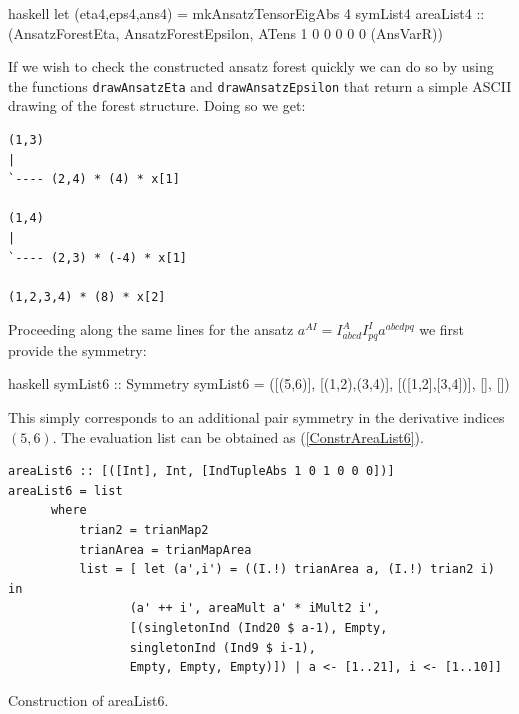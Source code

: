 \documentclass[a4paper,12pt, DIV=14, BCOR=5mm, twoside, headsepline, numbers=noenddot]{scrbook}
\begin{document}
\begin{center}
\begin{cminted}{haskell}
let (eta4,eps4,ans4) = mkAnsatzTensorEigAbs 4 symList4 areaList4 :: 
                         (AnsatzForestEta, AnsatzForestEpsilon,
                         ATens 1 0 0 0 0 0 (AnsVarR))
\end{cminted}
\end{center}

If we wish to check the constructed ansatz forest quickly we can do so by using the functions \texttt{drawAnsatzEta} and \texttt{drawAnsatzEpsilon} that return a simple ASCII drawing of the forest structure. Doing so we get:

\begin{center}
\begin{BVerbatim}
(1,3)
|
`---- (2,4) * (4) * x[1]

(1,4)
|
`---- (2,3) * (-4) * x[1]

(1,2,3,4) * (8) * x[2]
\end{BVerbatim}
\end{center}

Proceeding along the same lines for the ansatz $a^{AI} = I^A _{abcd} I^I_{pq} a^{abcdpq}$ we first provide the symmetry:

\begin{center}
\begin{cminted}{haskell}
symList6 :: Symmetry
symList6 = ([(5,6)], [(1,2),(3,4)], [([1,2],[3,4])], [], [])
\end{cminted}
\end{center}

This simply corresponds to an additional pair symmetry in the derivative indices $(5,6)$. The evaluation list can be obtained as (\ref{ConstrAreaList6}).

\begin{listing}[hbt!]
\begin{verbatim}
areaList6 :: [([Int], Int, [IndTupleAbs 1 0 1 0 0 0])]
areaList6 = list
      where
          trian2 = trianMap2
          trianArea = trianMapArea
          list = [ let (a',i') = ((I.!) trianArea a, (I.!) trian2 i) in
                 (a' ++ i', areaMult a' * iMult2 i', 
                 [(singletonInd (Ind20 $ a-1), Empty,
                 singletonInd (Ind9 $ i-1),
                 Empty, Empty, Empty)]) | a <- [1..21], i <- [1..10]]
\end{verbatim} 
\caption{Construction of areaList6.}\label{ConstrAreaList6}
\end{listing}
\end{document}
